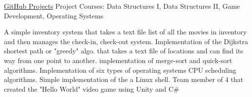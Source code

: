 \resumeSubheading
{\href{https://www.GitHub.com/markwmavis}{GitHub Projects}}{}
{Project Courses: Data Structures I, Data Structures II, Game Development, Operating Systems}{}

\resumeItemListStart
    {A simple inventory system that takes a text file list of all the movies in inventory and then manages the check-in, check-out system.}
    {Implementation of the Dijkstra shortest path or "greedy" algo. that takes a text file of locations and can find its way from one point to another.}
    {implementation of merge-sort and quick-sort algorithms.}
    {Implementation of six types of operating systems CPU scheduling algorithms.}
    {Simple implementation of the a Linux shell.}
    {Team member of 4 that created the "Hello World" video game using Unity and C\#}
\resumeSubHeadingListEnd